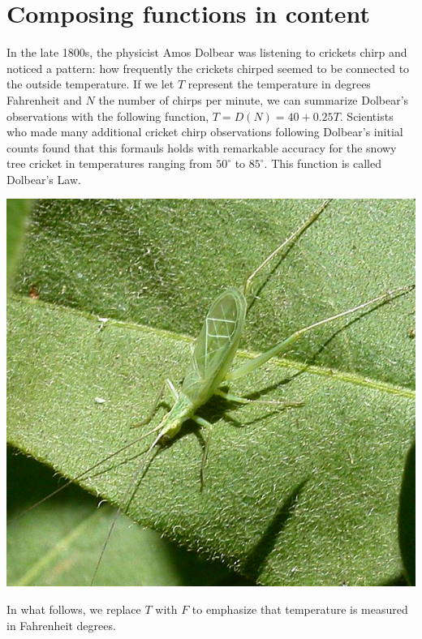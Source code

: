 \documentclass{ximera}
\begin{document}

\section{Composing functions in content}
In the late 1800s, the physicist Amos Dolbear was listening to crickets chirp and noticed a pattern: how frequently the crickets chirped seemed to be connected to the outside temperature. If we let $T$ represent the temperature in degrees Fahrenheit and $N$ the number of chirps per minute, we can summarize Dolbear's observations with the following function, $T=D(N)=40+0.25T$.  Scientists who made many additional cricket chirp observations following Dolbear's initial counts found that this formauls holds with remarkable accuracy for the snowy tree cricket in temperatures ranging from \(50^\circ\) to \(85^\circ\).  This function is called Dolbear's Law.

\begin{image}
\includegraphics{CompositionText3.jpg}
\end{image}

In what follows, we replace \(T\) with \(F\) to emphasize that temperature is measured in Fahrenheit degrees.
\end{document}
